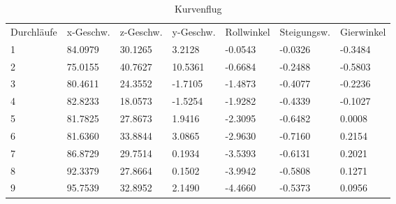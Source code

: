 \documentclass{article}
\begin{document}
\begin{table}
\centering
\caption{Kurvenflug}
\begin{tabular}{lllllll}
Durchläufe & x-Geschw. & z-Geschw. & y-Geschw. & Rollwinkel & Steigungsw. & Gierwinkel  \\
1          & 84.0979   & 30.1265   & 3.2128    & -0.0543    & -0.0326     & -0.3484     \\
2          & 75.0155   & 40.7627   & 10.5361   & -0.6684    & -0.2488     & -0.5803     \\
3          & 80.4611   & 24.3552   & -1.7105   & -1.4873    & -0.4077     & -0.2236     \\
4          & 82.8233   & 18.0573   & -1.5254   & -1.9282    & -0.4339     & -0.1027     \\
5          & 81.7825   & 27.8673   & 1.9416    & -2.3095    & -0.6482     & 0.0008      \\
6          & 81.6360   & 33.8844   & 3.0865    & -2.9630    & -0.7160     & 0.2154      \\
7          & 86.8729   & 29.7514   & 0.1934    & -3.5393    & -0.6131     & 0.2021      \\
8          & 92.3379   & 27.8664   & 0.1502    & -3.9942    & -0.5808     & 0.1271      \\
9          & 95.7539   & 32.8952   & 2.1490    & -4.4660    & -0.5373     & 0.0956     
\end{tabular}
\end{table}
 
\end{document}
